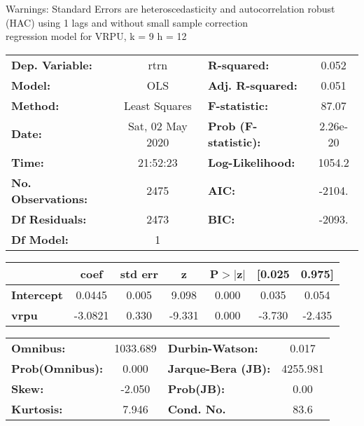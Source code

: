 Warnings: \newline
 [1] Standard Errors are heteroscedasticity and autocorrelation robust (HAC) using 1 lags and without small sample correction\\ 

regression model for VRPU, k = 9 h = 12\begin{center}
\begin{tabular}{lclc}
\toprule
\textbf{Dep. Variable:}    &       rtrn       & \textbf{  R-squared:         } &     0.052   \\
\textbf{Model:}            &       OLS        & \textbf{  Adj. R-squared:    } &     0.051   \\
\textbf{Method:}           &  Least Squares   & \textbf{  F-statistic:       } &     87.07   \\
\textbf{Date:}             & Sat, 02 May 2020 & \textbf{  Prob (F-statistic):} &  2.26e-20   \\
\textbf{Time:}             &     21:52:23     & \textbf{  Log-Likelihood:    } &    1054.2   \\
\textbf{No. Observations:} &        2475      & \textbf{  AIC:               } &    -2104.   \\
\textbf{Df Residuals:}     &        2473      & \textbf{  BIC:               } &    -2093.   \\
\textbf{Df Model:}         &           1      & \textbf{                     } &             \\
\bottomrule
\end{tabular}
\begin{tabular}{lcccccc}
                   & \textbf{coef} & \textbf{std err} & \textbf{z} & \textbf{P$> |$z$|$} & \textbf{[0.025} & \textbf{0.975]}  \\
\midrule
\textbf{Intercept} &       0.0445  &        0.005     &     9.098  &         0.000        &        0.035    &        0.054     \\
\textbf{vrpu}      &      -3.0821  &        0.330     &    -9.331  &         0.000        &       -3.730    &       -2.435     \\
\bottomrule
\end{tabular}
\begin{tabular}{lclc}
\textbf{Omnibus:}       & 1033.689 & \textbf{  Durbin-Watson:     } &    0.017  \\
\textbf{Prob(Omnibus):} &   0.000  & \textbf{  Jarque-Bera (JB):  } & 4255.981  \\
\textbf{Skew:}          &  -2.050  & \textbf{  Prob(JB):          } &     0.00  \\
\textbf{Kurtosis:}      &   7.946  & \textbf{  Cond. No.          } &     83.6  \\
\bottomrule
\end{tabular}
\end{center}

